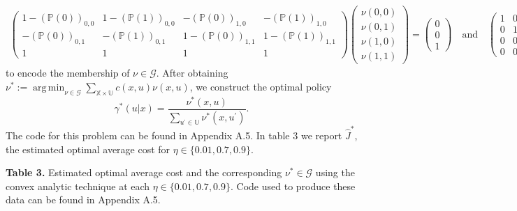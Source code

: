 \documentclass[10pt]{article}
\newcommand{\mbb}[1]{\mathbb{#1}}
\newcommand{\1}[1]{\mathbbm{1}_{#1}}
\newcommand{\mc}[1]{\mathcal{#1}}
\DeclareMathOperator{\argmin}{arg\,min}
\begin{document}
    \begin{align*}
        \begin{pmatrix}
            1 - (\mbb{P}(0))_{0,0} & 1 - (\mbb{P}(1))_{0,0} & -(\mbb{P}(0))_{1,0} & -(\mbb{P}(1))_{1,0}\\
            -(\mbb{P}(0))_{0,1} & -(\mbb{P}(1))_{0,1} & 1-(\mbb{P}(0))_{1,1} & 1-(\mbb{P}(1))_{1,1}\\
            1 & 1 & 1 & 1
        \end{pmatrix}\begin{pmatrix}
            \nu(0,0)\\
            \nu(0,1)\\
            \nu(1,0)\\
            \nu(1,1)
        \end{pmatrix}=\begin{pmatrix}
            0\\0\\1
        \end{pmatrix}\quad\text{and}\quad\begin{pmatrix}
            1 & 0 & 0 & 0\\
            0 & 1 & 0 & 0\\
            0 & 0 & 1 & 0\\
            0 & 0 & 0 & 1
        \end{pmatrix}\begin{pmatrix}
            \nu(0,0)\\
            \nu(0,1)\\
            \nu(1,0)\\
            \nu(1,1)
        \end{pmatrix}\succcurlyeq\begin{pmatrix}
            0\\0\\0\\0
        \end{pmatrix}
    \end{align*}
    to encode the membership of $\nu\in\mc{G}$. After obtaining $\nu^\ast:=\argmin_{\nu\in\mc{G}}\sum_{\mbb{X}\times\mbb{U}}c(x,u)\nu(x,u)$, we construct the optimal policy
    \[\gamma^\ast(u|x)=\frac{\nu^\ast(x,u)}{\sum_{u^\prime\in\mbb{U}}\nu^\ast(x,u^\prime)}.\tag{1}\]
    The code for this problem can be found in Appendix A.5. In table 3 we report $\hat{J}^\ast$, the estimated optimal average cost for $\eta\in\{0.01,0.7,0.9\}$.
    \begin{center}
        \begin{minipage}{\dimexpr\paperwidth-5cm}
            {\bf Table 3.} Estimated optimal average cost and the corresponding $\nu^\ast\in\mc{G}$ using the convex analytic technique at each $\eta\in\{0.01,0.7,0.9\}$. 
            Code used to produce these data can be found in Appendix A.5.
        \end{minipage}
    \end{center}
\end{document}
